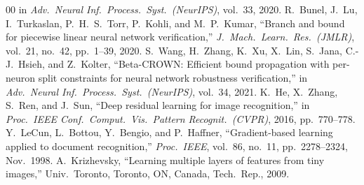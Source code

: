 \documentclass[conference]{IEEEtran}
\begin{document}
\begin{thebibliography}{00}
  in \textit{Adv.\ Neural Inf.\ Process.\ Syst.\ (NeurIPS)}, vol.~33, 2020.
  R.~Bunel, J.~Lu, I.~Turkaslan, P.~H.~S.~Torr, P.~Kohli, and
  M.~P.~Kumar,
  ``Branch and bound for piecewise linear neural network verification,''
  \textit{J.\ Mach.\ Learn.\ Res.\ (JMLR)}, vol.~21, no.~42,
  pp.~1--39, 2020.
  S.~Wang, H.~Zhang, K.~Xu, X.~Lin, S.~Jana, C.-J.~Hsieh, and Z.~Kolter,
  ``Beta-CROWN: Efficient bound propagation with per-neuron split
    constraints for neural network robustness verification,''
  in \textit{Adv.\ Neural Inf.\ Process.\ Syst.\ (NeurIPS)}, vol.~34, 2021.
  K.~He, X.~Zhang, S.~Ren, and J.~Sun,
  ``Deep residual learning for image recognition,''
  in \textit{Proc.\ IEEE Conf.\ Comput.\ Vis.\ Pattern Recognit.\ (CVPR)},
  2016, pp.~770--778.
  Y.~LeCun, L.~Bottou, Y.~Bengio, and P.~Haffner,
  ``Gradient-based learning applied to document recognition,''
  \textit{Proc.\ IEEE}, vol.~86, no.~11, pp.~2278--2324, Nov.~1998.
  A.~Krizhevsky,
  ``Learning multiple layers of features from tiny images,''
  Univ.\ Toronto, Toronto, ON, Canada, Tech.\ Rep., 2009.
\end{thebibliography}
\end{document}

